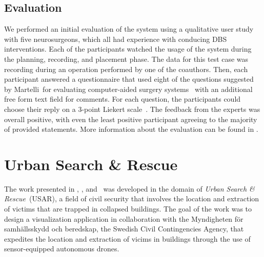 \subsection{Evaluation} \label{contributions:dbs:evaluation}
We performed an initial evaluation of the system using a qualitative user study with five neurosurgeons, which all had experience with conducing DBS interventions.  Each of the participants watched the usage of the system during the planning, recording, and placement phase.  The data for this test case was recording during an operation performed by one of the coauthors.  Then, each participant answered a questionnaire that used eight of the questions suggested by Martelli~\etal for evaluating computer-aided surgery systems~\cite{martelli2003criteria} with an additional free form text field for comments.  For each question, the participants could choose their reply on a 3-point Liekert scale~\cite{likert1932technique}.  The feedback from the experts was overall positive, with even the least positive participant agreeing to the majority of provided statements.  More information about the evaluation can be found in \paperDBS.






\section{Urban Search \& Rescue} \label{contributions:usar}
The work presented in \paperVMV, \paperSSRR, and \paperCGF\ was developed in the domain of \emph{Urban Search \& Rescue}~(USAR), a field of civil security that involves the location and extraction of victims that are trapped in collapsed buildings.  The goal of the work was to design a visualization application in collaboration with the Myndigheten f\"or samh\"allsskydd och beredskap, the Swedish Civil Contingencies Agency, that expedites the location and extraction of vicims in buildings through the use of sensor-equipped autonomous drones.

